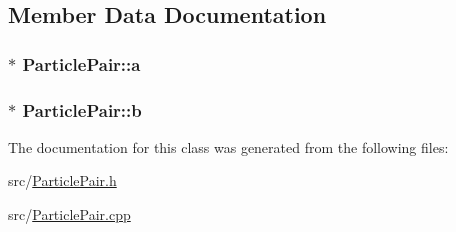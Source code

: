 \subsection{Member Data Documentation}
\subsubsection[{\texorpdfstring{a}{a}}]{$\ast$ Particle\+Pair\+::a}\hypertarget{classParticlePair_ac8efc4fede76b43da1d535dead99709b}{}\label{classParticlePair_ac8efc4fede76b43da1d535dead99709b}
\subsubsection[{\texorpdfstring{b}{b}}]{$\ast$ Particle\+Pair\+::b}\hypertarget{classParticlePair_a5556423960e9629e451a0ce355def174}{}\label{classParticlePair_a5556423960e9629e451a0ce355def174}


The documentation for this class was generated from the following files\+:\begin{DoxyCompactItemize}
\item 
src/\hyperlink{ParticlePair_8h}{Particle\+Pair.\+h}\item 
src/\hyperlink{ParticlePair_8cpp}{Particle\+Pair.\+cpp}\end{DoxyCompactItemize}
